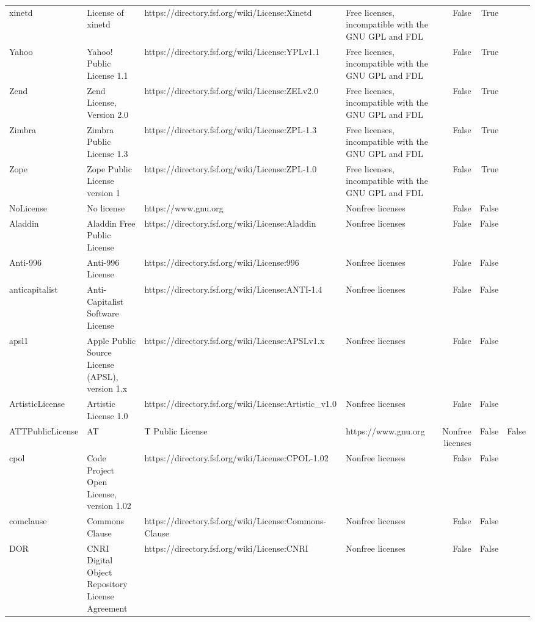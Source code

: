 \begin{tabular}{llllrr}
xinetd & License of xinetd & https://directory.fsf.org/wiki/License:Xinetd & Free licenses, incompatible with the GNU GPL and FDL & False & True \\
Yahoo & Yahoo! Public License 1.1 & https://directory.fsf.org/wiki/License:YPLv1.1 & Free licenses, incompatible with the GNU GPL and FDL & False & True \\
Zend & Zend License, Version 2.0 & https://directory.fsf.org/wiki/License:ZELv2.0 & Free licenses, incompatible with the GNU GPL and FDL & False & True \\
Zimbra & Zimbra Public License 1.3 & https://directory.fsf.org/wiki/License:ZPL-1.3 & Free licenses, incompatible with the GNU GPL and FDL & False & True \\
Zope & Zope Public License version 1 & https://directory.fsf.org/wiki/License:ZPL-1.0 & Free licenses, incompatible with the GNU GPL and FDL & False & True \\
NoLicense & No license & https://www.gnu.org & Nonfree licenses & False & False \\
Aladdin & Aladdin Free Public License & https://directory.fsf.org/wiki/License:Aladdin & Nonfree licenses & False & False \\
Anti-996 & Anti-996 License & https://directory.fsf.org/wiki/License:996 & Nonfree licenses & False & False \\
anticapitalist & Anti-Capitalist Software License & https://directory.fsf.org/wiki/License:ANTI-1.4 & Nonfree licenses & False & False \\
apsl1 & Apple Public Source License (APSL), version 1.x & https://directory.fsf.org/wiki/License:APSLv1.x & Nonfree licenses & False & False \\
ArtisticLicense & Artistic License 1.0 & https://directory.fsf.org/wiki/License:Artistic_v1.0 & Nonfree licenses & False & False \\
ATTPublicLicense & AT&T Public License & https://www.gnu.org & Nonfree licenses & False & False \\
cpol & Code Project Open License, version 1.02 & https://directory.fsf.org/wiki/License:CPOL-1.02 & Nonfree licenses & False & False \\
comclause & Commons Clause & https://directory.fsf.org/wiki/License:Commons-Clause & Nonfree licenses & False & False \\
DOR & CNRI Digital Object Repository License Agreement & https://directory.fsf.org/wiki/License:CNRI & Nonfree licenses & False & False \\

\end{tabular}
